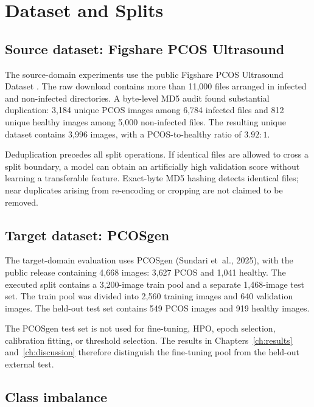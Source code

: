 \documentclass[../preamble.tex]{subfiles}
\begin{document}
\chapter{Dataset and Splits}
\label{ch:data}

\section{Source dataset: Figshare PCOS Ultrasound}
\label{sec:data-figshare}

The source-domain experiments use the public Figshare PCOS Ultrasound Dataset
\cite{figshare:pcos}.
The raw download contains more than 11{,}000 files arranged in infected and
non-infected directories. A byte-level MD5 audit found substantial duplication:
3{,}184 unique PCOS images among 6{,}784 infected files and 812 unique healthy
images among 5{,}000 non-infected files. The resulting unique dataset contains
3{,}996 images, with a PCOS-to-healthy ratio of $3.92{:}1$.

Deduplication precedes all split operations. If identical files are allowed to
cross a split boundary, a model can obtain an artificially high validation
score without learning a transferable feature. Exact-byte MD5 hashing detects
identical files; near duplicates arising from re-encoding or cropping are not
claimed to be removed.

\section{Target dataset: PCOSgen}
\label{sec:data-pcosgen}

The target-domain evaluation uses PCOSgen (Sundari et~al., 2025), with the
public release containing 4{,}668 images: 3{,}627 PCOS and 1{,}041 healthy.
The executed split contains a 3{,}200-image train pool and a separate
1{,}468-image test set. The train pool was divided into 2{,}560 training
images and 640 validation images. The held-out test set contains 549 PCOS
images and 919 healthy images.

The PCOSgen test set is not used for fine-tuning, HPO, epoch selection,
calibration fitting, or threshold selection. The results in Chapters~\ref{ch:results}
and~\ref{ch:discussion} therefore distinguish the fine-tuning pool from the
held-out external test.



\section{Class imbalance}
\label{sec:data-imbalance}
\end{document}
